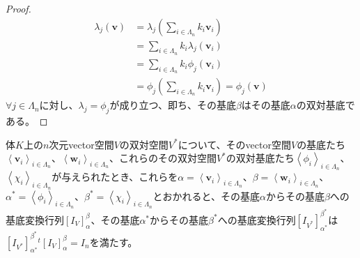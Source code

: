 \documentclass[dvipdfmx]{jsarticle}
\begin{document}
\begin{proof}
\begin{align*}
\lambda_{j}\left( \mathbf{v} \right) &= \lambda_{j}\left( \sum_{i \in \varLambda_{n}} {k_{i}\mathbf{v}_{i}} \right)\\
&= \sum_{i \in \varLambda_{n}} {k_{i}\lambda_{j}\left( \mathbf{v}_{i} \right)}\\
&= \sum_{i \in \varLambda_{n}} {k_{i}\phi_{j}\left( \mathbf{v}_{i} \right)}\\
&= \phi_{j}\left( \sum_{i \in \varLambda_{n}} {k_{i}\mathbf{v}_{i}} \right) = \phi_{j}\left( \mathbf{v} \right)
\end{align*}
$\forall j \in \varLambda_{n}$に対し、$\lambda_{j} = \phi_{j}$が成り立つ、即ち、その基底$\beta$はその基底$\alpha$の双対基底である。
\end{proof}
\begin{thm}\label{2.4.3.13}
体$K$上の$n$次元vector空間$V$の双対空間$V^{*}$について、そのvector空間$V$の基底たち$\left\langle \mathbf{v}_{i} \right\rangle_{i \in \varLambda_{n}}$、$\left\langle \mathbf{w}_{i} \right\rangle_{i \in \varLambda_{n}}$、これらのその双対空間$V^{*}$の双対基底たち$\left\langle \phi_{i} \right\rangle_{i \in \varLambda_{n}}$、$\left\langle \chi_{i} \right\rangle_{i \in \varLambda_{n}}$が与えられたとき、これらを$\alpha = \left\langle \mathbf{v}_{i} \right\rangle_{i \in \varLambda_{n}}$、$\beta = \left\langle \mathbf{w}_{i} \right\rangle_{i \in \varLambda_{n}}$、$\alpha^{*} = \left\langle \phi_{i} \right\rangle_{i \in \varLambda_{n}}$、$\beta^{*} = \left\langle \chi_{i} \right\rangle_{i \in \varLambda_{n}}$とおかれると、その基底$\alpha$からその基底$\beta$への基底変換行列$\left[ I_{V} \right]^{\beta}_{\alpha}$、その基底$\alpha^{*}$からその基底$\beta^{*}$への基底変換行列$\left[ I_{V^{*}} \right]^{\beta^{*}}_{\alpha^{*}}$は$\left[ I_{V^{*}} \right]^{\beta^{*}}_{\alpha^{*}}{}^{t}\left[ I_{V} \right]^{\beta}_{\alpha} = I_{n}$を満たす。
\end{thm}
\end{document}
